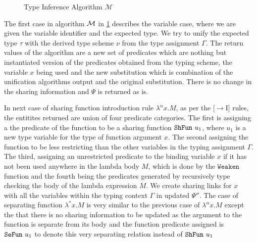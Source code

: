 \begin{figure}[h]
\begin{framed}
  \end{framed}
  \caption{Type Inference Algorithm $\mathcal{M}$}
  \label{fig:algorithm-m}
\end{figure}

The first case in algorithm $\mathcal{M}$ in \cref{fig:algorithm-m} describes the variable case, where we are given the variable identifier and
the expected type. We try to unify the expected type $\tau$ with the derived type scheme
$\nu$ from the type assignment $\Gamma$. The return values of the algorithm are
a new set of predicates which are nothing but instantiated version of the predicates
obtained from the typing scheme, the variable $x$ being used and the new
substitution which is combination of the unification algorithms output and the original
substitution. There is no change in the sharing information and $\Psi$ is returned as is.

In next case of sharing function introduction rule $\lambda^{\alpha}x.M$, as per the [$\rightarrow$I] rules, the entitites returned
are union of four predicate categories. The first is assigning a the predicate of the function to be
a sharing function $\texttt{ShFun}\ u_1$, where $u_1$ is a new type variable for the type of function argument $x$.
The second assigning the function to be less restricting than the other variables in the typing assignment $\Gamma$.
The third, assigning an unrestricted predicate to the binding variable $x$ if it has not been used
anywhere in the lambda body $M$, which is done by the $\texttt{Weaken}$ function and the fourth
being the predicates generated by recursively type checking the body of the lambda expression $M$.
We create sharing links for $x$ with all the variables within the typing context $\Gamma$ in updated
$\Psi''$.
The case of separating function $\lambda^{*}x. M$ is very similar to the previous case of $\lambda^{\alpha}x. M$ except
the that there is no sharing information to be updated as the argument to the function is
separate from its body and the function predicate assigned is $\texttt{SeFun}\ u_1$ to denote this very
separating relation instead of $\texttt{ShFun}\ u_1$

